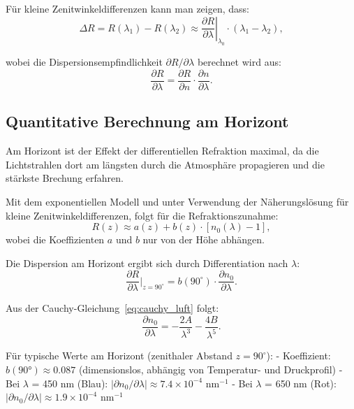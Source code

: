 \documentclass[12pt,a4paper]{article}
\begin{document}
Für kleine Zenitwinkeldifferenzen kann man zeigen, dass:
\begin{equation}
	\Delta R = R(\lambda_1) - R(\lambda_2) \approx 
	\left.\frac{\partial R}{\partial \lambda}\right|_{\lambda_0} \cdot (\lambda_1 - \lambda_2),
	\label{eq:R_taylor}
\end{equation}

wobei die Dispersionsempfindlichkeit $\partial R / \partial \lambda$ berechnet wird aus:
\begin{equation}
	\frac{\partial R}{\partial \lambda} = \frac{\partial R}{\partial n} \cdot \frac{\partial n}{\partial \lambda}.
	\label{eq:chain_rule_R}
\end{equation}

\subsection{Quantitative Berechnung am Horizont}
\label{subsec:horizont_dispersion}

Am Horizont ist der Effekt der differentiellen Refraktion maximal,
da die Lichtstrahlen dort am längsten durch die Atmosphäre propagieren
und die stärkste Brechung erfahren.

Mit dem exponentiellen Modell und unter Verwendung der
Näherungslösung für kleine Zenitwinkeldifferenzen, folgt für die Refraktionszunahme:
\begin{equation}
	R(z) \approx a(z) + b(z) \cdot [n_0(\lambda) - 1],
	\label{eq:refr_approx}
\end{equation}
wobei die Koeffizienten $a$ und $b$ nur von der Höhe abhängen.

Die Dispersion am Horizont ergibt sich durch Differentiation nach $\lambda$:
\begin{equation}
  \frac{\partial R}{\partial \lambda}\bigg|_{z=90^\circ} = b(90^\circ) \cdot \frac{\partial n_0}{\partial \lambda}.
	\label{eq:R_horizont_disp}
\end{equation}

Aus der Cauchy-Gleichung~\eqref{eq:cauchy_luft} folgt:
\begin{equation}
	\frac{\partial n_0}{\partial \lambda} = -\frac{2A}{\lambda^3} - \frac{4B}{\lambda^5}.
	\label{eq:dn0_dlambda}
\end{equation}

Für typische Werte am Horizont (zenithaler Abstand $z = 90^\circ$):
- Koeffizient: $b(90°) \approx 0.087$ (dimensionslos, abhängig von Temperatur- und Druckprofil)
- Bei $\lambda$ = 450 nm (Blau): $|\partial n_0/\partial \lambda| \approx 7.4 \times 10^{-4}$ nm$^{-1}$
- Bei $\lambda$ = 650 nm (Rot): $|\partial n_0/\partial \lambda| \approx 1.9 \times 10^{-4}$ nm$^{-1}$
\end{document}

